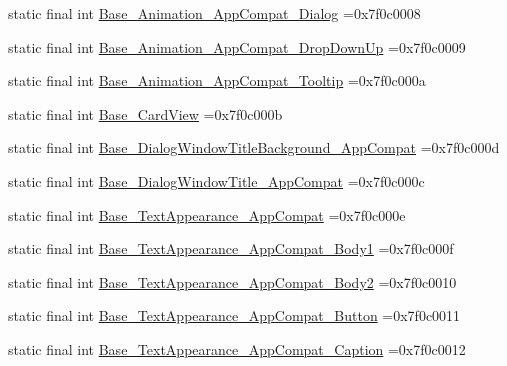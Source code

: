 \begin{DoxyCompactItemize}
\item 
static final int \mbox{\hyperlink{classbr_1_1unb_1_1cic_1_1mp_1_1marketmaster_1_1test_1_1R_1_1style_a2a1d84c31ee426cf2d2acf26556cf7fa}{Base\+\_\+\+Animation\+\_\+\+App\+Compat\+\_\+\+Dialog}} =0x7f0c0008
\item 
static final int \mbox{\hyperlink{classbr_1_1unb_1_1cic_1_1mp_1_1marketmaster_1_1test_1_1R_1_1style_a6de5ab73a2c6bef0b3ebb6e809da33d0}{Base\+\_\+\+Animation\+\_\+\+App\+Compat\+\_\+\+Drop\+Down\+Up}} =0x7f0c0009
\item 
static final int \mbox{\hyperlink{classbr_1_1unb_1_1cic_1_1mp_1_1marketmaster_1_1test_1_1R_1_1style_a7b03996fb14088316f1717448b134327}{Base\+\_\+\+Animation\+\_\+\+App\+Compat\+\_\+\+Tooltip}} =0x7f0c000a
\item 
static final int \mbox{\hyperlink{classbr_1_1unb_1_1cic_1_1mp_1_1marketmaster_1_1test_1_1R_1_1style_a497c460e8f6337621fc8ad8b031e7472}{Base\+\_\+\+Card\+View}} =0x7f0c000b
\item 
static final int \mbox{\hyperlink{classbr_1_1unb_1_1cic_1_1mp_1_1marketmaster_1_1test_1_1R_1_1style_a8205f259dccbf87d963744f5fb37c591}{Base\+\_\+\+Dialog\+Window\+Title\+Background\+\_\+\+App\+Compat}} =0x7f0c000d
\item 
static final int \mbox{\hyperlink{classbr_1_1unb_1_1cic_1_1mp_1_1marketmaster_1_1test_1_1R_1_1style_ab598ae14beee1cef3c8432eaa50db047}{Base\+\_\+\+Dialog\+Window\+Title\+\_\+\+App\+Compat}} =0x7f0c000c
\item 
static final int \mbox{\hyperlink{classbr_1_1unb_1_1cic_1_1mp_1_1marketmaster_1_1test_1_1R_1_1style_ab3d9c6dd5a2fd55a56cb38317947ed64}{Base\+\_\+\+Text\+Appearance\+\_\+\+App\+Compat}} =0x7f0c000e
\item 
static final int \mbox{\hyperlink{classbr_1_1unb_1_1cic_1_1mp_1_1marketmaster_1_1test_1_1R_1_1style_a5cd1947a99f037baa32d1e21412ab738}{Base\+\_\+\+Text\+Appearance\+\_\+\+App\+Compat\+\_\+\+Body1}} =0x7f0c000f
\item 
static final int \mbox{\hyperlink{classbr_1_1unb_1_1cic_1_1mp_1_1marketmaster_1_1test_1_1R_1_1style_aaa863b081dd2a2ef4efd22d9a9efc29a}{Base\+\_\+\+Text\+Appearance\+\_\+\+App\+Compat\+\_\+\+Body2}} =0x7f0c0010
\item 
static final int \mbox{\hyperlink{classbr_1_1unb_1_1cic_1_1mp_1_1marketmaster_1_1test_1_1R_1_1style_ad52c2260b4e0dbf43ae2a4eeb96a4651}{Base\+\_\+\+Text\+Appearance\+\_\+\+App\+Compat\+\_\+\+Button}} =0x7f0c0011
\item 
static final int \mbox{\hyperlink{classbr_1_1unb_1_1cic_1_1mp_1_1marketmaster_1_1test_1_1R_1_1style_aa13860c3fb9422b8ee8cc63981e8e41a}{Base\+\_\+\+Text\+Appearance\+\_\+\+App\+Compat\+\_\+\+Caption}} =0x7f0c0012

\end{DoxyCompactItemize}
